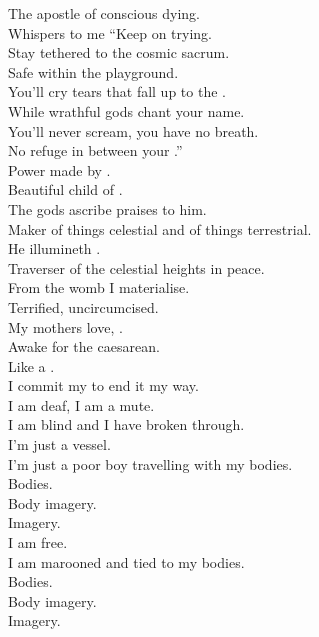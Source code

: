 

The apostle of conscious dying. \\
Whispers to me ``Keep on trying. \\
Stay tethered to the cosmic sacrum. \\
Safe within the  playground. \\
You'll cry tears that fall up to the . \\
While wrathful gods chant your name. \\
You'll never scream, you have no breath. \\
No refuge in between your .'' \\

Power made by . \\
Beautiful child of . \\
The gods ascribe praises to him. \\
Maker of things celestial and of things terrestrial. \\
He illumineth . \\
Traverser of the celestial heights in peace. \\

From the womb I materialise. \\
Terrified, uncircumcised. \\
My mothers love, . \\
Awake for the caesarean. \\
Like a . \\
I commit my  to end it my way. \\
I am deaf, I am a mute. \\
I am blind and I have broken through. \\

I'm just a vessel. \\
I'm just a poor boy travelling with my bodies. \\
Bodies. \\
Body imagery. \\
Imagery. \\
I am free. \\
I am marooned and tied to my bodies. \\
Bodies. \\
Body imagery. \\
Imagery. \\

